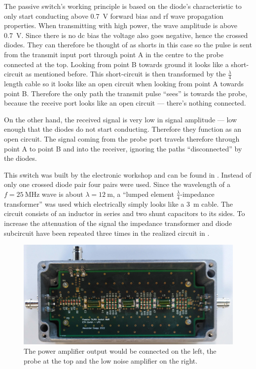 The passive switch's working principle is based on the diode's characteristic to only start conducting above \qty{0.7}{\volt} forward bias and \acrshort{rf} wave propagation properties. When transmitting with high power, the wave amplitude is above \qty{0.7}{\volt}. Since there is no \acrshort{dc} bias the voltage also goes negative, hence the crossed diodes. They can therefore be thought of as shorts in this case so the pulse is sent from the transmit input port through point A in the centre to the probe connected at the top. Looking from point B towards ground it looks like a short-circuit as mentioned before. This short-circuit is then transformed by the \(\frac{\lambda}{4}\) length cable so it looks like an open circuit when looking from point A towards point B. Therefore the only path the transmit pulse \enquote{sees} is towards the probe, because the receive port looks like an open circuit --- there's nothing connected.

On the other hand, the received signal is very low in signal amplitude --- low enough that the diodes do not start conducting. Therefore they function as an open circuit. The signal coming from the probe port travels therefore through point A to point B and into the receiver, ignoring the paths \enquote{disconnected} by the diodes.

This switch was built by the electronic workshop and can be found in . Instead of only one crossed diode pair four pairs were used. Since the wavelength of a \(f = \qty{25}{\mega\hertz}\) wave is about \(\lambda{} = \qty{12}{\metre}\), a \enquote{lumped element \(\frac{\lambda}{4}\)-impedance transformer} was used which electrically simply looks like a \qty{3}{\metre} cable. The circuit consists of an inductor in series and two shunt capacitors to its sides. To increase the attenuation of the signal the impedance transformer and diode subcircuit have been repeated three times in the realized circuit in .

\begin{figure}[hbt]
    \centering
    \includegraphics[width=\textwidth]{images/passive_tr_switch_assembled.jpg}
    \caption{ The power amplifier output would be connected on the left, the probe at the top and the low noise amplifier on the right.}
\end{figure}

